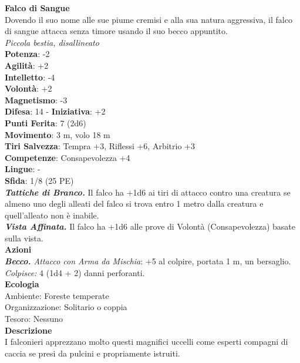 \begin{multicols}{2}
\medskip\textbf{Falco di Sangue}\\
Dovendo il suo nome alle sue piume cremisi e alla sua natura aggressiva, il falco di sangue attacca senza timore usando il suo becco appuntito.\\
\emph{Piccola bestia, disallineato}\\
\textbf{Potenza}: -2\\
\textbf{Agilità}: +2\\
\textbf{Intelletto}: -4\\
\textbf{Volontà}: +2\\
\textbf{Magnetismo}: -3\\
\textbf{Difesa}: 14 - \textbf{Iniziativa}: +2\\
\textbf{Punti Ferita}: 7 (2d6)\\
\textbf{Movimento}: 3 m, volo 18 m\\
\textbf{Tiri Salvezza}: Tempra +3, Riflessi +6, Arbitrio +3 \\
\textbf{Competenze}: Consapevolezza +4\\
\textbf{Lingue}: -\\
\textbf{Sfida}: 1/8 (25 PE)\smallskip\\
\emph{\textbf{Tattiche di Branco.}} Il falco ha +1d6 ai tiri di attacco contro una creatura se almeno uno degli alleati del falco si trova entro 1 metro dalla creatura e quell'alleato non è inabile.\\
\emph{\textbf{Vista Affinata.}} Il falco ha +1d6 alle prove di Volontà (Consapevolezza) basate sulla vista.\\
\smallskip\textbf{Azioni}\\
\emph{\textbf{Becco.} Attacco con Arma da Mischia}: +5 al colpire, portata 1 m, un bersaglio.\\
\emph{Colpisce:} 4 (1d4 + 2) danni perforanti.\\
\textbf{Ecologia}\\
Ambiente: Foreste temperate\\
Organizzazione: Solitario o coppia\\
Tesoro: Nessuno\\
\textbf{Descrizione}\\
I falconieri apprezzano molto questi magnifici uccelli come esperti compagni di caccia se presi da pulcini e propriamente istruiti. \\



\end{multicols}
